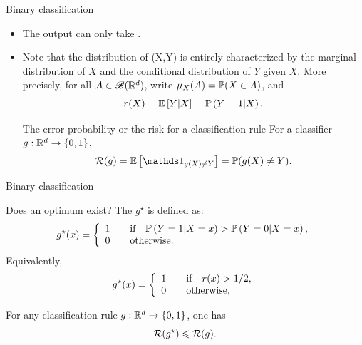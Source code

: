 \documentclass[xcolor={usenames,dvipsnames},handout]{beamer}
\begin{document}
\begin{frame}{Binary classification}

\begin{itemize}
\item The output can only take .


\item Note that the distribution of (X,Y) is entirely characterized by the marginal distribution of $X$ and the conditional distribution of  $Y$ given $X$. More precisely, for all $A\in \mathscr{B}(\R^d)$, write $\mu_X(A) = \P ( X \in A )$, and
$$
r(X) = \E \left[ Y | X\right] = \P \left( Y=1 | X \right).
$$



\begin{block}{The {error probability} or the {risk for a classification rule}}
For a classifier $g : \R^d \to \{0,1\}$,
$$
\Rc(g) = \E \left[ \one_{g(X)\neq Y} \right] =  \P (g(X) \neq Y).
$$
\end{block}

\end{itemize}
\end{frame}

\begin{frame}{Binary classification}

\begin{block}{Does an optimum exist?} 
The  $g^\star$ is defined as:
$$
g^{\star}(x) =
\left\{
	\begin{array}{cc}
		1 &\quad \text{if} \quad \P \left( Y=1 | X=x \right) > \P \left( Y=0 | X=x \right), \\
		0 &\quad \text{otherwise}. \hfill
	\end{array}
\right.
$$
Equivalently,
$$
g^{\star}(x) =
\left\{
	\begin{array}{cc}
		1 &\quad \text{if} \quad r(x) > 1/2, \\
		0 &\quad \text{otherwise}, \hfill
	\end{array}
\right.
$$
\end{block}
\begin{lemma}
For any classification rule $g :  \R^d \to \{0,1\}$, one has
$$
\Rc(g^\star) \leq \Rc(g).
$$
\end{lemma}



\end{frame}
\end{document}
